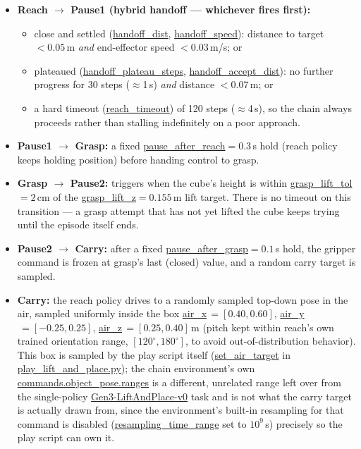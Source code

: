 \documentclass[11pt]{article}
\begin{document}
\begin{itemize}
    \item \textbf{Reach $\to$ Pause1 (hybrid handoff --- whichever fires first):}
    \begin{itemize}
        \item close and settled (\url{handoff_dist}, \url{handoff_speed}):
        distance to target $< 0.05$\,m \emph{and}
        end-effector speed $< 0.03$\,m/s; or
        \item plateaued (\url{handoff_plateau_steps}, \url{handoff_accept_dist}):
        no further progress for 30 steps ($\approx$1\,s)
        \emph{and} distance $< 0.07$\,m; or
        \item a hard timeout (\url{reach_timeout}) of 120 steps ($\approx$4\,s), so the chain always
        proceeds rather than stalling indefinitely on a poor approach.
    \end{itemize}
    \item \textbf{Pause1 $\to$ Grasp:} a fixed \url{pause_after_reach}$=0.3$\,s hold (reach policy keeps
    holding position) before handing control to grasp.
    \item \textbf{Grasp $\to$ Pause2:} triggers when the cube's height is within
    \url{grasp_lift_tol}$=2$\,cm of the \url{grasp_lift_z}$=0.155$\,m lift target. There is no timeout on this transition --- a
    grasp attempt that has not yet lifted the cube keeps trying until the episode
    itself ends.
    \item \textbf{Pause2 $\to$ Carry:} after a fixed \url{pause_after_grasp}$=0.1$\,s hold, the gripper command is
    frozen at grasp's last (closed) value, and a random carry target is sampled.
    \item \textbf{Carry:} the reach policy drives to a randomly sampled top-down
    pose in the air, sampled uniformly inside the box
    \url{air_x}$\,=[0.40, 0.60]$, \url{air_y}$\,=[-0.25, 0.25]$,
    \url{air_z}$\,=[0.25, 0.40]$\,m (pitch kept within reach's own trained orientation range,
    $[120^\circ, 180^\circ]$, to avoid out-of-distribution behavior). This box is
    sampled by the play script itself (\url{set_air_target} in
    \url{play_lift_and_place.py}); the chain environment's own
    \url{commands.object_pose.ranges} is a different, unrelated range left over
    from the single-policy \url{Gen3-LiftAndPlace-v0} task and is not what the
    carry target is actually drawn from, since the environment's built-in
    resampling for that command is disabled (\url{resampling_time_range} set to
    $10^9$\,s) precisely so the play script can own it.
\end{itemize}
\end{document}
